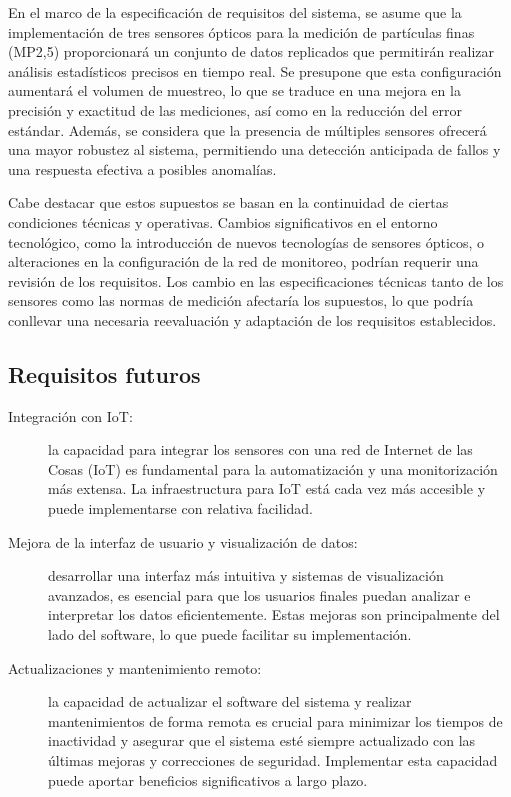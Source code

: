 \documentclass[
11pt, %
codirector, %
]{charter}
\begin{document}
En el marco de la especificación de requisitos del sistema, se asume que la implementación de tres sensores ópticos para la medición de partículas finas (MP2,5) proporcionará un conjunto de datos replicados que permitirán realizar análisis estadísticos precisos en tiempo real. Se presupone que esta configuración aumentará el volumen de muestreo, lo que se traduce en una mejora en la precisión y exactitud de las mediciones, así como en la reducción del error estándar. Además, se considera que la presencia de múltiples sensores ofrecerá una mayor robustez al sistema, permitiendo una detección anticipada de fallos y una respuesta efectiva a posibles anomalías.

Cabe destacar que estos supuestos se basan en la continuidad de ciertas condiciones técnicas y operativas. Cambios significativos en el entorno tecnológico, como la introducción de nuevos tecnologías de sensores ópticos, o alteraciones en la configuración de la red de monitoreo, podrían requerir una revisión de los requisitos. Los cambio en las especificaciones técnicas tanto de los sensores como las normas de medición afectaría los supuestos, lo que podría conllevar una necesaria reevaluación y adaptación de los requisitos establecidos.


\subsection{Requisitos futuros}
\label{sec:org33cfcdb}

\begin{description}
	\item[Integración con IoT:] la capacidad para integrar los sensores con una red de Internet de las Cosas (IoT) es fundamental para la automatización y una monitorización más extensa. La infraestructura para IoT está cada vez más accesible y puede implementarse con relativa facilidad.
	
	\item[Mejora de la interfaz de usuario y visualización de datos:] desarrollar una interfaz más intuitiva y sistemas de visualización avanzados, es esencial para que los usuarios finales puedan analizar e interpretar los datos eficientemente. Estas mejoras son principalmente del lado del software, lo que puede facilitar su implementación.
	
	\item[Actualizaciones y mantenimiento remoto:] la capacidad de actualizar el software del sistema y realizar mantenimientos de forma remota es crucial para minimizar los tiempos de inactividad y asegurar que el sistema esté siempre actualizado con las últimas mejoras y correcciones de seguridad. Implementar esta capacidad  puede aportar beneficios significativos a largo plazo.
\end{description}
\end{document}
